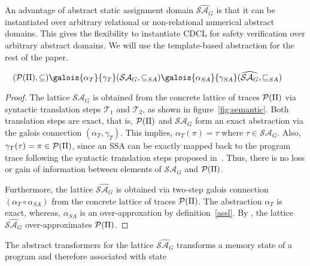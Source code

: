 An advantage of abstract static assignment domain $\widehat{\mathcal{SA}_{G}}$ 
is that it can be instantiated over arbitrary relational or non-relational 
numerical abstract domains.  This gives the flexibility to instantiate CDCL for 
safety verification over arbitrary abstract domains. 
%
We will use the template-based abstraction for the rest of the paper. 
\begin{proposition}~\label{ag}
  $
  (\powerset({\Pi}),\subseteq)
    \galois{\alpha_{T}}{\gamma_{T}}
  (\mathcal{SA}_{G},\subseteq_{SA})
   \galois{\alpha_{SA}}{\gamma_{SA}}
   (\widehat{\mathcal{SA}_{G}},\sqsubseteq_{SA})
  $ 
\end{proposition}
%
\begin{proof}
  The lattice $\mathcal{SA}_G$ is obtained from the concrete lattice of 
  traces $\mathcal{P}(\Pi)$ via syntactic translation steps $\mathcal{T}_1$ and
  $\mathcal{T}_2$, as shown in figure~\ref{fig:semantic}.  Both translation
  steps are exact, that is, $\mathcal{P}(\Pi)$ and $\mathcal{SA}_G$ form an 
  exact abstraction via the galois 
  connection $(\alpha_T, \gamma_T)$. This implies, $\alpha_T(\pi) = \tau$ where
  $\tau \in \mathcal{SA}_G$.  Also, $\gamma_T(\tau) = \pi \in \mathcal{P}(\Pi)$,
  since an SSA can be exactly mapped back to the program trace following the
  syntactic translation steps proposed in~\cite{Briggs:1998}.   
  Thus, there is no loss or gain of information between elements of 
  $\mathcal{SA}_{G}$ and $\mathcal{P}(\Pi)$.


  Furthermore, the lattice $\widehat{\mathcal{SA}_{G}}$ is obtained via 
  two-step galois connection $(\alpha_{T} \circ \alpha_{SA})$ from
  the concrete lattice of traces $\mathcal{P}(\Pi)$. The abstraction $\alpha_{T}$
  is exact, whereas, $\alpha_{SA}$ is an over-approxation by
  definition~\ref{assl}.
  By , the lattice 
  $\widehat{\mathcal{SA}_{G}}$ over-approximates $\mathcal{P}(\Pi)$.
\end{proof}
%
%
The abstract transformers for the lattice $\widehat{\mathcal{SA}_{G}}$ 
transforms a memory state of a program and therefore associated with state 
